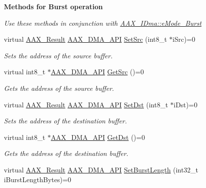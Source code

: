 \begin{Indent}{\bf Methods for Burst operation}\par
{\em Use these methods in conjunction with \hyperlink{a00095_af8d0f19f2896dd6dbd126b919b24e39ba253c129077dc004dd83cca8931e69eb9}{A\+A\+X\+\_\+\+I\+Dma\+::e\+Mode\+\_\+\+Burst} }\begin{DoxyCompactItemize}
\item 
virtual \hyperlink{a00149_a4d8f69a697df7f70c3a8e9b8ee130d2f}{A\+A\+X\+\_\+\+Result} \hyperlink{a00243_acae60d01e5e4bd3282369d0d9d378f3f}{A\+A\+X\+\_\+\+D\+M\+A\+\_\+\+A\+P\+I} \hyperlink{a00095_a92774eab2dec8864d617e2655f3de00d}{Set\+Src} (int8\+\_\+t $\ast$i\+Src)=0
\begin{DoxyCompactList}\small\item\em Sets the address of the source buffer. \end{DoxyCompactList}\item 
virtual int8\+\_\+t $\ast$\hyperlink{a00243_acae60d01e5e4bd3282369d0d9d378f3f}{A\+A\+X\+\_\+\+D\+M\+A\+\_\+\+A\+P\+I} \hyperlink{a00095_af3adfd15058b274b01b86705d42a4cd6}{Get\+Src} ()=0
\begin{DoxyCompactList}\small\item\em Gets the address of the source buffer. \end{DoxyCompactList}\item 
virtual \hyperlink{a00149_a4d8f69a697df7f70c3a8e9b8ee130d2f}{A\+A\+X\+\_\+\+Result} \hyperlink{a00243_acae60d01e5e4bd3282369d0d9d378f3f}{A\+A\+X\+\_\+\+D\+M\+A\+\_\+\+A\+P\+I} \hyperlink{a00095_a80c98a61fc14c8cc87a30360e92655fe}{Set\+Dst} (int8\+\_\+t $\ast$i\+Dst)=0
\begin{DoxyCompactList}\small\item\em Sets the address of the destination buffer. \end{DoxyCompactList}\item 
virtual int8\+\_\+t $\ast$\hyperlink{a00243_acae60d01e5e4bd3282369d0d9d378f3f}{A\+A\+X\+\_\+\+D\+M\+A\+\_\+\+A\+P\+I} \hyperlink{a00095_a19544dc2ec903f8e80d80db846ea8af0}{Get\+Dst} ()=0
\begin{DoxyCompactList}\small\item\em Gets the address of the destination buffer. \end{DoxyCompactList}\item 
virtual \hyperlink{a00149_a4d8f69a697df7f70c3a8e9b8ee130d2f}{A\+A\+X\+\_\+\+Result} \hyperlink{a00243_acae60d01e5e4bd3282369d0d9d378f3f}{A\+A\+X\+\_\+\+D\+M\+A\+\_\+\+A\+P\+I} \hyperlink{a00095_ac85fdea20b072cbdc258aa398d02fa92}{Set\+Burst\+Length} (int32\+\_\+t i\+Burst\+Length\+Bytes)=0

\end{DoxyCompactItemize}
\end{Indent}
